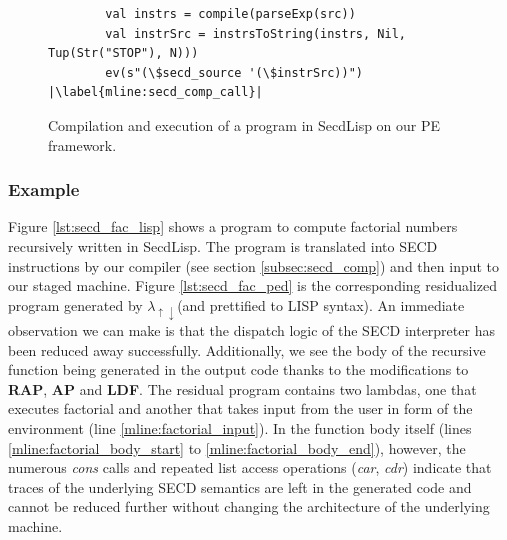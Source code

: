 \documentclass[a4paper,12pt,twoside,openright]{report}
\theoremstyle{definition}
\newcommand{\mslang}{$\lambda_{\uparrow\downarrow}$}
\newcommand{\secdlisp}{SecdLisp}
\begin{document}
\begin{figure}[htp!]
\centering
\begin{verbatim}
        val instrs = compile(parseExp(src))
        val instrSrc = instrsToString(instrs, Nil, Tup(Str("STOP"), N)))
        ev(s"(\$secd_source '(\$instrSrc))") |\label{mline:secd_comp_call}|
\end{verbatim}
\caption{Compilation and execution of a program in \secdlisp{} on our PE framework.}
\label{lst:secd_comp_ex1}
\end{figure}

\subsubsection{Example}
Figure \ref{lst:secd_fac_lisp} shows a program to compute factorial numbers recursively written in \secdlisp. The program is translated into SECD instructions by our compiler (see section \ref{subsec:secd_comp}) and then input to our staged machine. Figure \ref{lst:secd_fac_ped} is the corresponding residualized program generated by \mslang (and prettified to LISP syntax). An immediate observation we can make is that the dispatch logic of the SECD interpreter has been reduced away successfully. Additionally, we see the body of the recursive function being generated in the output code thanks to the modifications to \textbf{RAP}, \textbf{AP} and \textbf{LDF}. The residual program contains two lambdas, one that executes factorial and another that takes input from the user in form of the environment (line \ref{mline:factorial_input}). In the function body itself (lines \ref{mline:factorial_body_start} to \ref{mline:factorial_body_end}), however, the numerous \textit{cons} calls and repeated list access operations (\textit{car}, \textit{cdr}) indicate that traces of the underlying SECD semantics are left in the generated code and cannot be reduced further without changing the architecture of the underlying machine.
\end{document}
